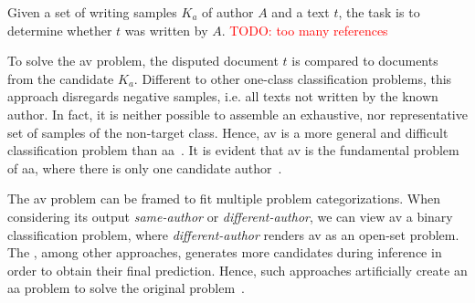 \begin{definition}
    [\acl{av}]   
    Given a set of writing samples $K_a$ of author $A$ and a text $t$, the task is to determine whether $t$ was written by $A$.
    \textcolor{red}{TODO: too many references}
\end{definition}


To solve the \ac{av} problem, the disputed document $t$ is compared to documents from the candidate $K_a$.
Different to other one-class classification problems, this approach disregards negative samples, i.e. all texts not written by the known author.
In fact, it is neither possible to assemble an exhaustive, nor representative set of samples of the non-target class.
Hence, \ac{av} is a more general and difficult classification problem than \ac{aa}~\citep{llm_detection_av_2025,neal_surveying_2018,koppel_authorship_2004}.
It is evident that \ac{av} is the fundamental problem of \ac{aa}, where there is only one candidate author~\citep{barlas_cross_domain_2020,tyo_state_2022}.

The \ac{av} problem can be framed to fit multiple problem categorizations.
When considering its output \textit{same-author} or \textit{different-author}, we can view \ac{av} a binary classification problem, where \textit{different-author} renders \ac{av} as an open-set problem.
The \impAppr{}, among other approaches, generates more candidates during inference in order to obtain their final prediction.
Hence, such approaches artificially create an \ac{aa} problem to solve the original problem~\citep{neal_surveying_2018}.
